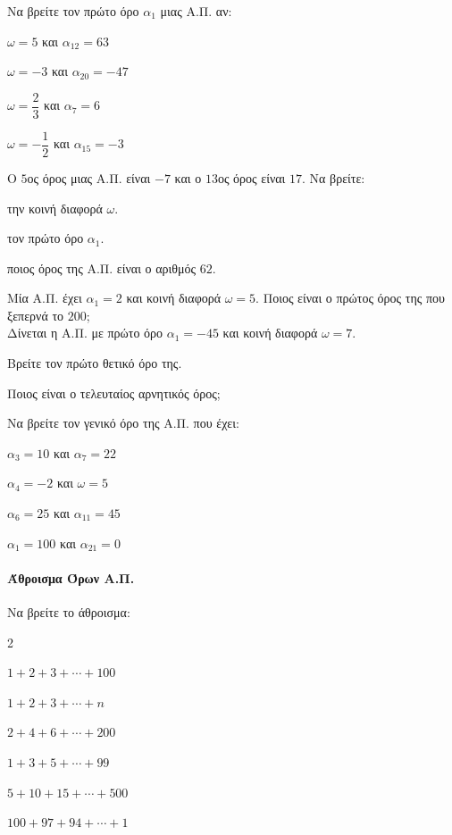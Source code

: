\documentclass[11pt,a4paper,modern]{FFExercises}
\begin{document}
\askhsh Να βρείτε τον πρώτο όρο $\alpha_1$ μιας Α.Π. αν:
\begin{alist}
\item $\omega=5$ και $\alpha_{12}=63$
\item $\omega=-3$ και $\alpha_{20}=-47$
\item $\omega=\dfrac{2}{3}$ και $\alpha_{7}=6$
\item $\omega=-\dfrac{1}{2}$ και $\alpha_{15}=-3$
\end{alist}

\askhsh Ο $5$ος όρος μιας Α.Π. είναι $-7$ και ο $13$ος όρος είναι $17$. Να βρείτε:
\begin{alist}
\item την κοινή διαφορά $\omega$.
\item τον πρώτο όρο $\alpha_1$.
\item ποιος όρος της Α.Π. είναι ο αριθμός $62$.
\end{alist}

\askhsh Μία Α.Π. έχει $\alpha_1=2$ και κοινή διαφορά $\omega=5$. Ποιος είναι ο πρώτος όρος της που ξεπερνά το $200$;\\

\askhsh Δίνεται η Α.Π. με πρώτο όρο $\alpha_1=-45$ και κοινή διαφορά $\omega=7$.
\begin{alist}
\item Βρείτε τον πρώτο θετικό όρο της.
\item Ποιος είναι ο τελευταίος αρνητικός όρος;
\end{alist}

\askhsh Να βρείτε τον γενικό όρο της Α.Π. που έχει:
\begin{alist}
\item $\alpha_3=10$ και $\alpha_7=22$
\item $\alpha_4=-2$ και $\omega=5$
\item $\alpha_6=25$ και $\alpha_{11}=45$
\item $\alpha_1=100$ και $\alpha_{21}=0$
\end{alist}

\paragraph{Άθροισμα Όρων Α.Π.}

\askhsh Να βρείτε το άθροισμα:
\begin{multicols}{2}
\begin{alist}
\item $1+2+3+\cdots+100$
\item $1+2+3+\cdots+n$
\item $2+4+6+\cdots+200$
\item $1+3+5+\cdots+99$
\item $5+10+15+\cdots+500$
\item $100+97+94+\cdots+1$
\end{alist}
\end{multicols}
\end{document}
